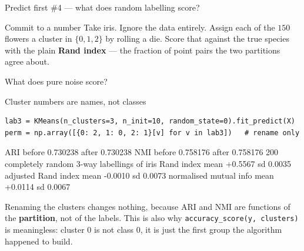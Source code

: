 \documentclass[aspectratio=169]{beamer}
\begin{document}
\begin{frame}{Predict first \#4 --- what does random labelling score?}
  \begin{alertblock}{Commit to a number}
    Take iris. Ignore the data entirely. Assign each of the $150$ flowers a
    cluster in $\{0,1,2\}$ by rolling a die. Score that against the true
    species with the plain \textbf{Rand index} --- the fraction of point
    pairs the two partitions agree about.

    \medskip
    \centering\large
    What does pure noise score?
  \end{alertblock}
\end{frame}

\begin{frame}[fragile,shrink=8]{Cluster numbers are names, not classes}
\begin{lstlisting}
lab3 = KMeans(n_clusters=3, n_init=10, random_state=0).fit_predict(X)
perm = np.array([{0: 2, 1: 0, 2: 1}[v] for v in lab3])   # rename only
\end{lstlisting}
\begin{outblk}
   ARI before 0.730238   after 0.730238
   NMI before 0.758176   after 0.758176
200 completely random 3-way labellings of iris
   Rand index                   mean +0.5567  sd 0.0035
   adjusted Rand index          mean -0.0010  sd 0.0073
   normalised mutual info       mean +0.0114  sd 0.0067
\end{outblk}
  \begin{center}\small
    Renaming the clusters changes nothing, because ARI and NMI are functions
    of the \textbf{partition}, not of the labels. This is also why
    \texttt{accuracy\_score(y, clusters)} is meaningless: cluster $0$ is not
    class $0$, it is just the first group the algorithm happened to build.
  \end{center}
\end{frame}
\end{document}
